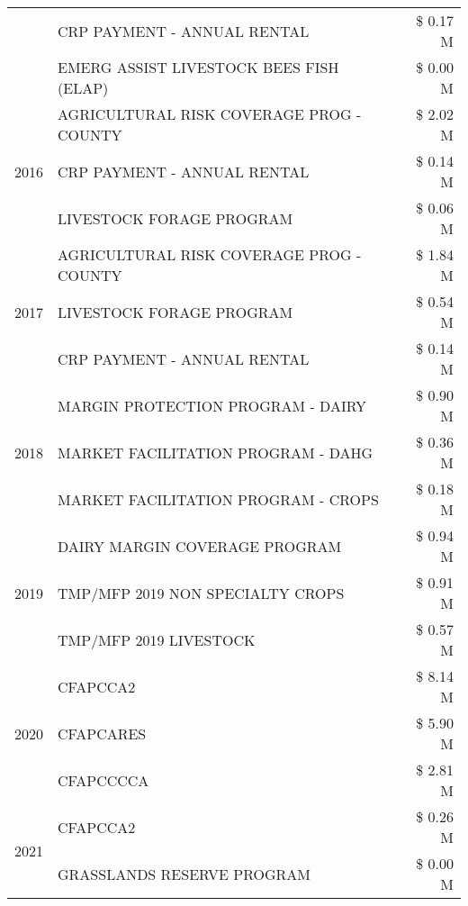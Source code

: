 \begin{tabular}{llr}
 & CRP PAYMENT - ANNUAL RENTAL & \$ 0.17 M \\
 & EMERG ASSIST LIVESTOCK BEES FISH (ELAP) & \$ 0.00 M \\
\cline{1-3}
\multirow[t]{3}{*}{2016} & AGRICULTURAL RISK COVERAGE PROG - COUNTY & \$ 2.02 M \\
 & CRP PAYMENT - ANNUAL RENTAL & \$ 0.14 M \\
 & LIVESTOCK FORAGE PROGRAM & \$ 0.06 M \\
\cline{1-3}
\multirow[t]{3}{*}{2017} & AGRICULTURAL RISK COVERAGE PROG - COUNTY & \$ 1.84 M \\
 & LIVESTOCK FORAGE PROGRAM & \$ 0.54 M \\
 & CRP PAYMENT - ANNUAL RENTAL & \$ 0.14 M \\
\cline{1-3}
\multirow[t]{3}{*}{2018} & MARGIN PROTECTION PROGRAM - DAIRY & \$ 0.90 M \\
 & MARKET FACILITATION PROGRAM - DAHG & \$ 0.36 M \\
 & MARKET FACILITATION PROGRAM - CROPS & \$ 0.18 M \\
\cline{1-3}
\multirow[t]{3}{*}{2019} & DAIRY MARGIN COVERAGE PROGRAM & \$ 0.94 M \\
 & TMP/MFP 2019 NON SPECIALTY CROPS & \$ 0.91 M \\
 & TMP/MFP 2019 LIVESTOCK & \$ 0.57 M \\
\cline{1-3}
\multirow[t]{3}{*}{2020} & CFAPCCA2 & \$ 8.14 M \\
 & CFAPCARES & \$ 5.90 M \\
 & CFAPCCCCA & \$ 2.81 M \\
\cline{1-3}
\multirow[t]{2}{*}{2021} & CFAPCCA2 & \$ 0.26 M \\
 & GRASSLANDS RESERVE PROGRAM & \$ 0.00 M \\
\cline{1-3}
\bottomrule
\end{tabular}
